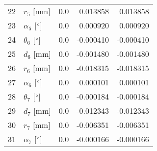 \documentclass{standalone}%
\begin{document}
\begin{tabular}{llrrr}
22 &              $r_{5}$ [mm] &       0.0 &   0.013858 &   0.013858 \\
23 &  $\alpha_{5}$ [$\degree$] &       0.0 &   0.000920 &   0.000920 \\
24 &  $\theta_{6}$ [$\degree$] &       0.0 &  -0.000410 &  -0.000410 \\
25 &              $d_{6}$ [mm] &       0.0 &  -0.001480 &  -0.001480 \\
26 &              $r_{6}$ [mm] &       0.0 &  -0.018315 &  -0.018315 \\
27 &  $\alpha_{6}$ [$\degree$] &       0.0 &   0.000101 &   0.000101 \\
28 &  $\theta_{7}$ [$\degree$] &       0.0 &  -0.000184 &  -0.000184 \\
29 &              $d_{7}$ [mm] &       0.0 &  -0.012343 &  -0.012343 \\
30 &              $r_{7}$ [mm] &       0.0 &  -0.006351 &  -0.006351 \\
31 &  $\alpha_{7}$ [$\degree$] &       0.0 &  -0.000166 &  -0.000166 \\
\bottomrule
\end{tabular}
%
\end{document}
